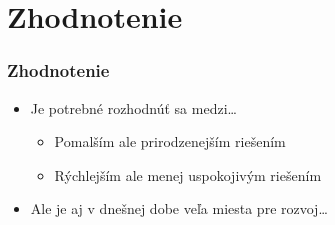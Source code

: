 \documentclass{beamer}
\begin{document}
\section*{Zhodnotenie}

\begin{frame}[fragile=singleslide]\frametitle{Zhodnotenie}
\begin{itemize}
\item Je potrebné rozhodnúť sa medzi\ldots{}
    \begin{itemize}
    \item Pomalším ale prirodzenejším riešením
    \item Rýchlejším ale menej uspokojivým riešením
    \end{itemize}
\item Ale je aj v dnešnej dobe veľa miesta pre rozvoj\ldots{}
\end{itemize}
\end{frame}
\end{document}

